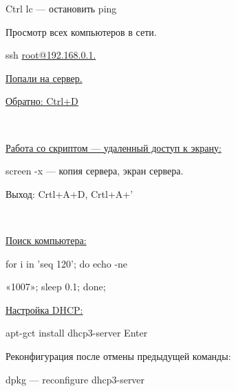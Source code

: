 \par 
Ctrl lc — остановить ping
\par 
Просмотр всех компьютеров в сети.
\par ssh
\underline{root@192.168.0.1.}
\par \underline{Попали
на сервер.}
\par \underline{Обратно:
Ctrl+D}
\par \\

\par 
\underline{Работа со скриптом — удаленный доступ
к экрану:}
\par 
screen -x — копия сервера, экран сервера.
\par 
Выход: Crtl+A+D, Crtl+A+'
\par \\

\par 
\underline{Поиск компьютера:}
\par 
for i in 'seq 120'; do echo -ne
\par 
	«1007»; sleep 0.1; done;
\par 
\underline{Настройка DHCP:}
\par 
apt-gct install dhcp3-server Enter
\par 
Реконфигурация после отмены предыдущей
команды:
\par 
dpkg — reconfigure dhcp3-server 

